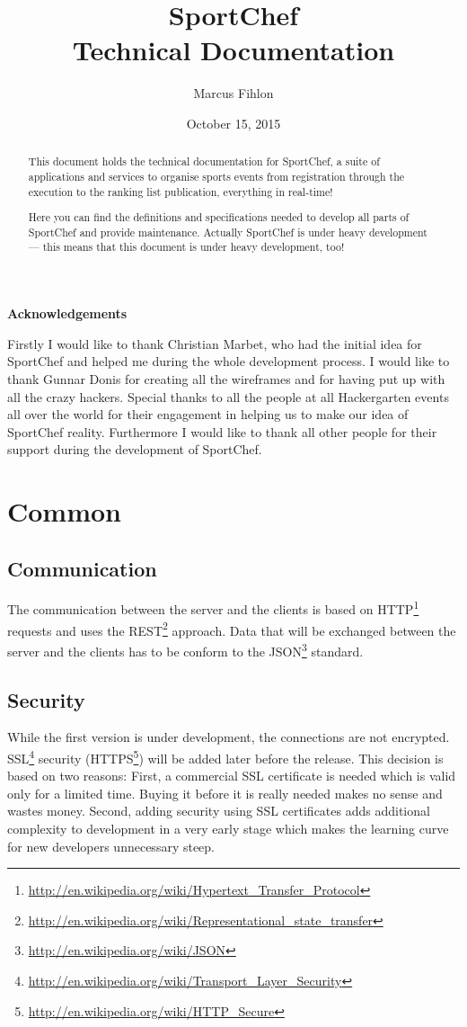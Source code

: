 \documentclass[a4paper,openright,twoside]{report}
\title{\huge SportChef \\[0.25cm] \LARGE Technical Documentation}
\author{Marcus Fihlon}
\date{October 15, 2015}
\makeatletter
\newcommand\ackname{Acknowledgements}
\newenvironment{acknowledgements}{%
      \titlepage
      \null\vfil
      \@beginparpenalty\@lowpenalty
      \begin{center}%
        \bfseries \ackname
        \@endparpenalty\@M
      \end{center}}%
     {\par\vfil\null\endtitlepage}
\newenvironment{acknowledgements}{%
      \if@twocolumn
        \section*{\abstractname}%
      \else
        \small
        \begin{center}%
          {\bfseries \ackname\vspace{-.5em}\vspace{\z@}}%
        \end{center}%
        \quotation
      \fi}
      {\if@twocolumn\else\endquotation\fi}
\makeatother
\begin{document}
\maketitle
\newpage

\begin{abstract}
This document holds the technical documentation for SportChef, a suite of applications and services to organise sports events from registration through the execution to the ranking list publication, everything in real-time!

Here you can find the definitions and specifications needed to develop all parts of SportChef and provide maintenance. Actually SportChef is under heavy development --- this means that this document is under heavy development, too!
\end{abstract}
\newpage

\begin{acknowledgements}
Firstly I would like to thank Christian Marbet, who had the initial idea for SportChef and helped me during the whole development process. I would like to thank Gunnar Donis for creating all the wireframes and for having put up with all the crazy hackers. Special thanks to all the people at all Hackergarten events all over the world for their engagement in helping us to make our idea of SportChef reality. Furthermore I would like to thank all other people for their support during the development of SportChef.
\end{acknowledgements}
\newpage

\tableofcontents
\newpage

\chapter{Common}

\section{Communication}\label{sec:Communication}
The communication between the server and the clients is based on HTTP\footnote{\url{http://en.wikipedia.org/wiki/Hypertext_Transfer_Protocol}} requests and uses the REST\footnote{\url{http://en.wikipedia.org/wiki/Representational_state_transfer}} approach. Data that will be exchanged between the server and the clients has to be conform to the JSON\footnote{\url{http://en.wikipedia.org/wiki/JSON}} standard.

\section{Security}
While the first version is under development, the connections are not encrypted. SSL\footnote{\url{http://en.wikipedia.org/wiki/Transport_Layer_Security}} security (HTTPS\footnote{\url{http://en.wikipedia.org/wiki/HTTP_Secure}}) will be added later before the release. This decision is based on two reasons: First, a commercial SSL certificate is needed which is valid only for a limited time. Buying it before it is really needed makes no sense and wastes money. Second, adding security using SSL certificates adds additional complexity to development in a very early stage which makes the learning curve for new developers unnecessary steep.
\end{document}
